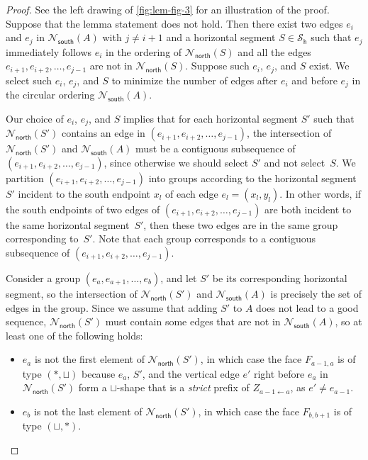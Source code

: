 \documentclass{article}\usepackage[a4paper,margin=20mm]{geometry}
\newcommand{\PH}{\mathcal{S}_\mathsf{h}}
\newcommand{\Nnorth}{\mathcal{N}_\mathsf{north}}
\newcommand{\Nsouth}{\mathcal{N}_\mathsf{south}}
\begin{document}
\begin{proof}
See the left drawing of \cref{fig:lem-fig-3} for an illustration of the proof.  
 Suppose that the lemma statement does not hold. Then there exist two edges $e_i$ and $e_j$ in $\Nsouth(A)$ with $j \neq i+1$ and a horizontal segment $S \in \PH$ such that $e_j$ immediately follows $e_i$ in the ordering of $\Nnorth(S)$ and all the edges $e_{i+1}, e_{i+2}, \ldots, e_{j-1}$ are not in $\Nnorth(S)$. 
 Suppose such $e_i$, $e_j$, and $S$ exist. We select such $e_i$, $e_j$, and $S$ to minimize the number of edges after $e_i$ and before $e_j$ in the circular ordering $\Nsouth(A)$.
 
 Our choice of $e_i$, $e_j$, and $S$ implies that for each horizontal segment $S'$ such that $\Nnorth(S')$ contains an edge in $(e_{i+1}, e_{i+2}, \ldots, e_{j-1})$, the intersection of $\Nnorth(S')$ and $\Nsouth(A)$ must be a contiguous subsequence of $(e_{i+1}, e_{i+2}, \ldots, e_{j-1})$, since otherwise we should select $S'$ and not select~$S$. We  partition $(e_{i+1}, e_{i+2}, \ldots, e_{j-1})$ into groups according to the horizontal segment~$S'$ incident to the south endpoint $x_l$ of each edge $e_l=(x_l, y_l)$. In other words, if the south endpoints of two edges of $(e_{i+1}, e_{i+2}, \ldots, e_{j-1})$ are both incident to the same horizontal segment~$S'$, then these two edges are in the same group corresponding to~$S'$.
 Note that each group corresponds to a contiguous subsequence of $(e_{i+1}, e_{i+2}, \ldots, e_{j-1})$. 
 
 Consider a group $(e_a, e_{a+1}, \ldots, e_b)$, and let $S'$ be its corresponding horizontal segment, so the intersection of $\Nnorth(S')$ and $\Nsouth(A)$ is precisely the set of edges in the group. Since we assume that adding $S'$ to $A$ does not lead to a good sequence, $\Nnorth(S')$ must contain some edges that are not in $\Nsouth(A)$, so at least one of the following holds:
 \begin{itemize}
     \item $e_a$ is not the first element of  $\Nnorth(S')$, in which case the face $F_{a-1,a}$ is of type $(\ast,\sqcup)$ because $e_a$, $S'$, and the vertical edge $e'$ right before $e_a$ in $\Nnorth(S')$ form a $\sqcup$-shape that is a \emph{strict} prefix of $Z_{a-1 \leftarrow a}$, as $e' \neq e_{a-1}$.
     \item $e_b$ is not the last element of $\Nnorth(S')$, in which case the face $F_{b,b+1}$ is of type $(\sqcup,\ast)$.
 \end{itemize}
 

\end{proof}
\end{document}
